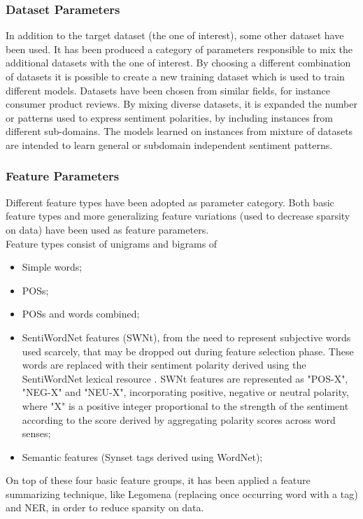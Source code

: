 \subsubsection{Dataset Parameters}

In addition to the target dataset (the one of interest), some other dataset have been used. It has been produced a category of parameters responsible to mix the additional datasets with the one of interest. By choosing a different combination of datasets it is possible to create a new training dataset which is used to train different models. Datasets have been chosen from similar fields, for instance consumer product reviews. By mixing diverse datasets, it is expanded the number or patterns used to express sentiment polarities, by including instances from different sub-domains. The models learned on instances from mixture of datasets are intended to learn general or subdomain independent sentiment patterns.

\subsubsection{Feature Parameters}

Different feature types have been adopted as parameter category. Both basic feature types and more generalizing feature variations (used to decrease sparsity on data) have been used as feature parameters.\\
Feature types consist of unigrams and bigrams of
\begin{itemize}
	\item Simple words;
	\item \aclp{POS};
	\item \aclp{POS} and words combined;
	\item SentiWordNet features (SWNt), from the need to represent subjective words used scarcely, that may be dropped out during feature selection phase. These words are replaced with their sentiment polarity derived using the SentiWordNet lexical resource \cite{Esuli2006sentiwordnet}. SWNt features are represented as "POS-X", "NEG-X" and "NEU-X", incorporating positive, negative or neutral polarity, where "X" is a positive integer proportional to the strength of the sentiment according to the score derived by aggregating polarity scores across word senses;
	\item Semantic features (Synset tags derived using WordNet);
\end{itemize}

On top of these four basic feature groups, it has been applied a feature summarizing technique, like Legomena (replacing once occurring word with a tag) and \ac{NER}, in order to reduce sparsity on data.


